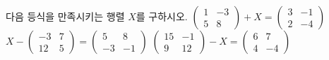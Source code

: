 다음 등식을 만족시키는 행렬 $X$를 구하시오.
 $\begin{pmatrix} 1 & -3 \\ 5 & 8 \end{pmatrix}+X=\begin{pmatrix} 3 & -1 \\ 2 & -4 \end{pmatrix}$
 $X-\begin{pmatrix} -3 & 7 \\ 12 & 5 \end{pmatrix}=\begin{pmatrix} 5 & 8 \\ -3 & -1 \end{pmatrix}$
 $\begin{pmatrix} 15 & -1 \\ 9 & 12 \end{pmatrix}-X=\begin{pmatrix} 6 & 7 \\ 4 & -4 \end{pmatrix}$
